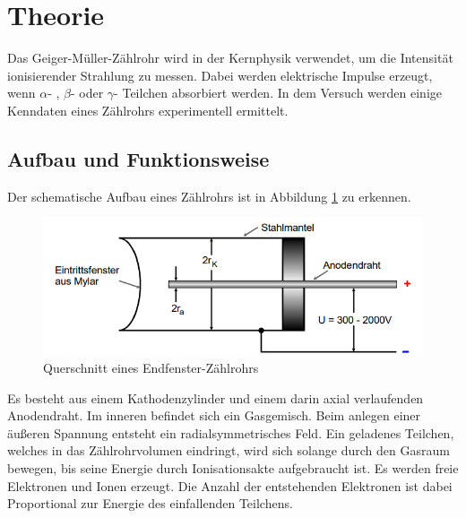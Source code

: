 \section{Theorie}
\label{sec:Theorie}
Das Geiger-Müller-Zählrohr wird in der Kernphysik verwendet, um die Intensität ionisierender Strahlung zu messen.
Dabei werden elektrische Impulse erzeugt, wenn $\alpha$- , $\beta$- oder $\gamma$- Teilchen absorbiert werden. In dem Versuch werden
einige Kenndaten eines Zählrohrs experimentell ermittelt.
\subsection{Aufbau und Funktionsweise}
Der schematische Aufbau eines Zählrohrs ist in Abbildung \ref{fig:aufbau} zu erkennen.
\begin{figure}
    \centering
    \includegraphics[scale=0.4]{pics/Aufbau.png}
    \caption{Querschnitt eines Endfenster-Zählrohrs}
    \label{fig:aufbau}
  \end{figure}
Es besteht aus einem Kathodenzylinder und einem darin axial verlaufenden Anodendraht. Im inneren befindet sich ein Gasgemisch.
Beim anlegen einer äußeren Spannung entsteht ein radialsymmetrisches Feld. Ein geladenes Teilchen, welches in das Zählrohrvolumen eindringt,
wird sich solange durch den Gasraum bewegen, bis seine Energie durch Ionisationsakte aufgebraucht ist. 
Es werden freie Elektronen und Ionen erzeugt. Die Anzahl der entstehenden Elektronen ist dabei Proportional zur Energie des einfallenden Teilchens.
